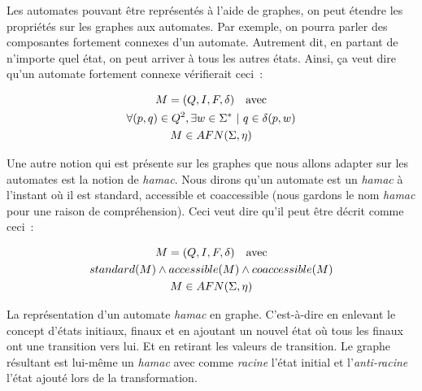 Les automates pouvant être représentés à l'aide de graphes, on peut étendre les
propriétés sur les graphes aux automates. Par exemple, on pourra parler des
composantes fortement connexes d'un automate. Autrement dit, en partant de
n'importe quel état, on peut arriver à tous les autres états. Ainsi, ça veut
dire qu'un automate fortement connexe vérifierait ceci~:

\begin{gather*}
    M = (Q, I, F, \delta) \quad \text{avec} \\
    \forall (p, q) \in Q^2, \exists w \in \Sigma^* ~|~ q \in \delta(p, w) \notag \\
    M \in AFN(\Sigma, \eta) \notag
\end{gather*}

\begin{definition}
    Une autre notion qui est présente sur les graphes que nous allons adapter
    sur les automates est la notion de \textit{hamac}. Nous dirons qu'un
    automate est un \textit{hamac} à l'instant où il est standard, accessible
    et coaccessible (nous gardons le nom \textit{hamac} pour une raison de
    compréhension). Ceci veut dire qu'il peut être décrit comme ceci~:

    \begin{gather*}
        M = (Q, I, F, \delta) \quad \text{avec} \\
        standard(M) \land accessible(M) \land coaccessible(M) \\
        M \in AFN(\Sigma, \eta) \notag
    \end{gather*}
\end{definition}

\begin{conjecture}
    La représentation d'un automate \textit{hamac} en graphe. C'est-à-dire en
    enlevant le concept d'états initiaux, finaux et en ajoutant un nouvel état
    où tous les finaux ont une transition vers lui. Et en retirant les valeurs
    de transition. Le graphe résultant est lui-même un \textit{hamac} avec
    comme \textit{racine} l'état initial et l'\textit{anti-racine} l'état
    ajouté lors de la transformation.
\end{conjecture}

